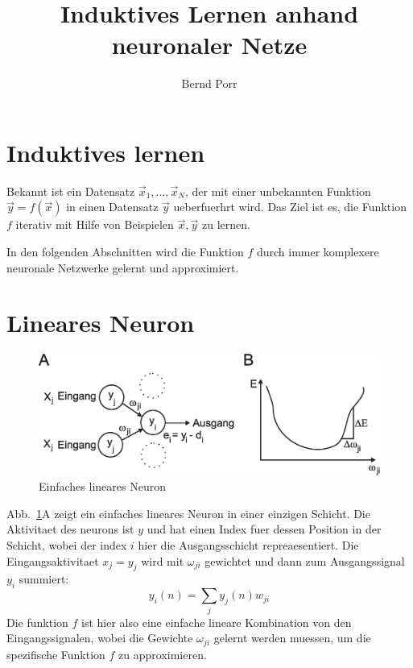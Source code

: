 \documentclass[12pt]{article}
\author{Bernd Porr}
\title{Induktives Lernen anhand neuronaler Netze}
\begin{document}
\maketitle

\section{Induktives lernen}
Bekannt ist ein Datensatz $\vec{x}_1, \ldots, \vec{x}_N$, der mit einer unbekannten Funktion $\vec{y}=f(\vec{x})$ in einen Datensatz $\vec{y}$
ueberfuerhrt wird. Das Ziel ist es, die Funktion $f$ iterativ mit Hilfe von Beispielen $\vec{x},\vec{y}$ zu lernen.

In den folgenden Abschnitten wird die Funktion $f$ durch immer komplexere neuronale Netzwerke gelernt und approximiert.

\section{Lineares Neuron}

\begin{figure}[!hbt]
\begin{center}
\mbox{\includegraphics[width=\textwidth]{one_layer}}
\end{center}
\caption{Einfaches lineares Neuron
\label{one_layer}}
\end{figure}

Abb.~\ref{one_layer}A zeigt ein einfaches lineares Neuron in einer
einzigen Schicht. Die Aktivitaet des neurons ist $y$ und hat einen
Index fuer dessen Position in der Schicht, wobei der index $i$ hier
die Ausgangsschicht repreaesentiert. Die Eingangsaktivitaet $x_j =
y_j$ wird mit $\omega_{ji}$ gewichtet und dann zum Ausgangssignal
$y_i$ summiert:
\begin{equation}
  y_i(n) = \sum_j y_j(n) w_{ji} \label{linear_sum}
\end{equation}
Die funktion $f$ ist hier also eine einfache lineare Kombination von den Eingangssignalen, wobei
die Gewichte $\omega_{ji}$ gelernt werden muessen, um die spezifische Funktion $f$ zu approximieren.
\end{document}
